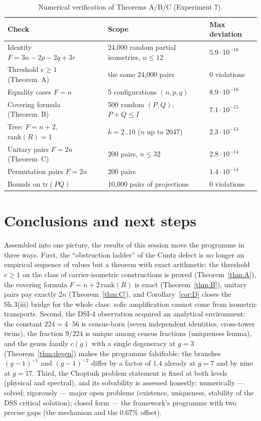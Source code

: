 \documentclass[11pt,a4paper]{article}
\theoremstyle{definition}
\theoremstyle{remark}
\begin{document}
\begin{table}[htbp]
\centering
\small
\caption{Numerical verification of Theorems A/B/C (Experiment 7).}
\label{tab:verify}
\begin{tabularx}{\textwidth}{@{}lYY@{}}
\toprule
Check & Scope & Max deviation \\
\midrule
Identity $F = 3n - 2p - 2q + 3r$ & 24{,}000 random partial isometries,
$n \le 12$ & $5.9\cdot 10^{-16}$ \\
Threshold $e \ge 1$ (Theorem~A) & the same 24{,}000 pairs & 0 violations \\
Equality cases $F = n$ & 5 configurations $(n, p, q)$ & $8.9\cdot 10^{-16}$ \\
Covering formula (Theorem~B) & 500 random $(P, Q)$, $P + Q \le I$ &
$7.1\cdot 10^{-15}$ \\
Tree: $F = n + 2$, $\mathrm{rank}(R) = 1$ & $k = 2..10$ ($n$ up to 2047) &
$2.3\cdot 10^{-13}$ \\
Unitary pairs $F = 2n$ (Theorem~C) & 200 pairs, $n \le 32$ & $2.8\cdot 10^{-14}$ \\
Permutation pairs $F = 2n$ & 200 pairs & $1.4\cdot 10^{-14}$ \\
Bounds on $\mathrm{tr}(PQ)$ & 10{,}000 pairs of projections & 0 violations \\
\bottomrule
\end{tabularx}
\end{table}

\section{Conclusions and next steps}\label{sec:conclusions}

Assembled into one picture, the results of this session move the programme in
three ways. First, the ``obstruction ladder'' of the Cuntz defect is no
longer an empirical sequence of values but a theorem with exact arithmetic:
the threshold $e \ge 1$ on the class of carrier-isometric constructions is
proved (Theorem~\ref{thm:A}), the covering formula
$F = n + 2\,\mathrm{rank}(R)$ is exact (Theorem~\ref{thm:B}), unitary pairs
pay exactly $2n$ (Theorem~\ref{thm:C}), and Corollary~\ref{cor:D} closes the
Sh.3(iii) bridge for the whole class: sofic amplification cannot come from
isometric transports. Second, the DSI-4 observation acquired an analytical
environment: the constant $224 = 4\cdot 56$ is census-born (seven independent
identities, cross-tower twins), the fraction $9/224$ is unique among census
fractions (uniqueness lemma), and the genus family $c(g)$ with a single
degeneracy at $g = 3$ (Theorem~\ref{thm:degen}) makes the programme
falsifiable: the branches $(g-1)^{-1}$ and $(g-1)^{-2}$ differ by a factor
of $1.4$ already at $g = 7$ and by nine at $g = 17$. Third, the Choptuik
problem statement is fixed at both levels (physical and spectral), and its
solvability is assessed honestly: numerically --- solved; rigorously --- major
open problems (existence, uniqueness, stability of the DSS critical
solution); closed form --- the framework's programme with two precise gaps
(the mechanism and the $0.67\%$ offset).
\end{document}
